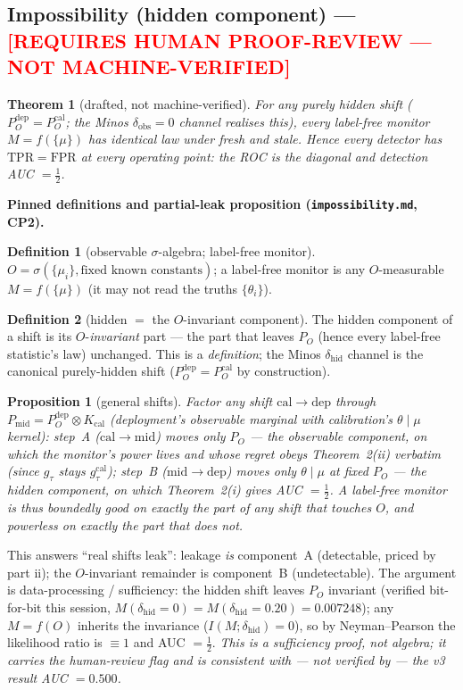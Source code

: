 \documentclass[11pt]{article}
\theoremstyle{plain}
\newtheorem{theorem}{Theorem}
\newtheorem{proposition}{Proposition}
\theoremstyle{definition}
\newtheorem{definition}{Definition}
\newcommand{\PO}{P_{O}}
\newcommand{\humanflag}{\textcolor{red}{\textbf{[REQUIRES HUMAN PROOF-REVIEW — NOT MACHINE-VERIFIED]}}}
\begin{document}
\subsection{Impossibility (hidden component) --- \humanflag}
\begin{theorem}[drafted, not machine-verified]
For any purely hidden shift ($\PO^{\mathrm{dep}}=\PO^{\mathrm{cal}}$; the Minos $\delta_{\mathrm{obs}}=0$
channel realises this), every label-free monitor $M=f(\{\mu\})$ has identical law under \emph{fresh} and
\emph{stale}. Hence every detector has $\mathrm{TPR}=\mathrm{FPR}$ at every operating point: the ROC is
the diagonal and detection AUC $=\tfrac12$.
\end{theorem}

\noindent\textbf{Pinned definitions and partial-leak proposition (\texttt{impossibility.md}, CP2).}
\begin{definition}[observable $\sigma$-algebra; label-free monitor]
$O=\sigma(\{\mu_i\},\text{fixed known constants})$; a label-free monitor is any $O$-measurable
$M=f(\{\mu\})$ (it may not read the truths $\{\theta_i\}$).
\end{definition}
\begin{definition}[hidden $=$ the $O$-invariant component]
The hidden component of a shift is its $O$-\emph{invariant} part --- the part that leaves $\PO$ (hence
every label-free statistic's law) unchanged. This is a \emph{definition}; the Minos $\delta_{\mathrm{hid}}$
channel is the canonical purely-hidden shift ($\PO^{\mathrm{dep}}=\PO^{\mathrm{cal}}$ by construction).
\end{definition}
\begin{proposition}[general shifts]
Factor any shift $\mathrm{cal}\to\mathrm{dep}$ through $P_{\mathrm{mid}}=\PO^{\mathrm{dep}}\otimes
K_{\mathrm{cal}}$ (deployment's observable marginal with calibration's $\theta\mid\mu$ kernel):
step~A ($\mathrm{cal}\to\mathrm{mid}$) moves only $\PO$ --- the \emph{observable} component, on which the
monitor's power lives and whose regret obeys Theorem~2(ii) \emph{verbatim} (since $g_\tau$ stays
$g_\tau^{\mathrm{cal}}$); step~B ($\mathrm{mid}\to\mathrm{dep}$) moves only $\theta\mid\mu$ at fixed
$\PO$ --- the \emph{hidden} component, on which Theorem~2(i) gives AUC $=\tfrac12$. A label-free monitor
is thus boundedly good on exactly the part of any shift that touches $O$, and powerless on exactly the
part that does not.
\end{proposition}
\noindent This answers ``real shifts leak'': leakage \emph{is} component~A (detectable, priced by part
ii); the $O$-invariant remainder is component~B (undetectable). The argument is data-processing /
sufficiency: the hidden shift leaves $\PO$ invariant (verified bit-for-bit this session,
$M(\delta_{\mathrm{hid}}{=}0)=M(\delta_{\mathrm{hid}}{=}0.20)=0.007248$); any $M=f(O)$ inherits the
invariance ($I(M;\delta_{\mathrm{hid}})=0$), so by Neyman--Pearson the likelihood ratio is $\equiv1$ and
AUC $=\tfrac12$. \emph{This is a sufficiency proof, not algebra; it carries the human-review flag and is
consistent with --- not verified by --- the v3 result AUC $=0.500$.}
\end{document}
